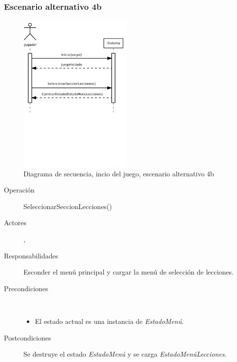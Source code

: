 \subsubsection{Escenario alternativo 4b}
\begin{figure}[h!]
  \centering
  \includegraphics[trim=0cm 10cm 0cm 0cm, clip=true, width=0.5\textwidth]{4_analisis/diagsec_caso1_esc3}
  \caption{Diagrama de secuencia, incio del juego, escenario alternativo 4b}
\end{figure}

\begin{description}
\item[Operación] SeleccionarSeccionLecciones()
\item[Actores] \jugador, \sistema
\item[Responsabilidades] Esconder el menú principal y cargar la menú de
  selección de lecciones.
\item[Precondiciones] $\quad$
  \begin{itemize}
  \item El estado actual es una instancia de \textit{EstadoMenú}.
  \end{itemize}
\item[Postcondiciones] Se destruye el estado \textit{EstadoMenú} y se carga
  \textit{EstadoMenúLecciones}.
\end{description}

